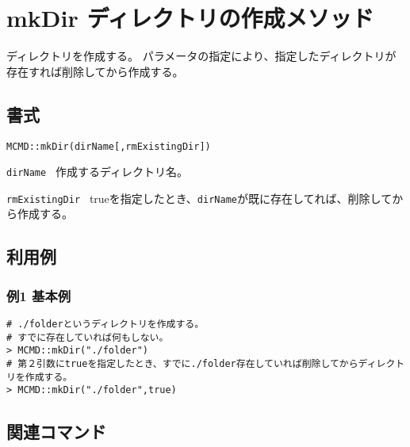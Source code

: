 
%

\section{mkDir ディレクトリの作成メソッド\label{sect:mkDir}}
ディレクトリを作成する。
パラメータの指定により、指定したディレクトリが存在すれば削除してから作成する。

\subsection{書式}

{\large
\begin{verbatim}
MCMD::mkDir(dirName[,rmExistingDir])
\end{verbatim}
} 

\begin{description}
	\setlength{\itemindent}{-5mm}
	\item {\large \verb/dirName /} 作成するディレクトリ名。
	\item {\large \verb/rmExistingDir /} trueを指定したとき、\verb/dirName/が既に存在してれば、削除してから作成する。
\end{description}

\subsection{利用例}
\subsubsection*{例1 基本例}

\begin{Verbatim}[baselinestretch=0.7,frame=single]
# ./folderというディレクトリを作成する。
# すでに存在していれば何もしない。
> MCMD::mkDir("./folder")
# 第２引数にtrueを指定したとき、すでに./folder存在していれば削除してからディレクトリを作成する。
> MCMD::mkDir("./folder",true)
\end{Verbatim}

\subsection{関連コマンド}

%

